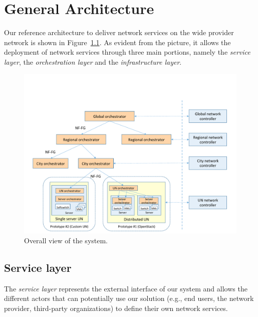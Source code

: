 

\chapter{General Architecture}
\label{chap:gen_arch}
\label{sec:gen_arch}
Our reference architecture to deliver network services on the wide provider network is shown in Figure~\ref{fig:orchestrator}.
As evident from the picture, it allows the deployment of network services through three main portions, namely the \textit{service layer}, the \textit{orchestration layer} and the \textit{infrastructure layer}.

\begin{figure}[h]
	\centering
	\includegraphics[clip= true, width= 1\columnwidth, trim= 0.5cm 0.5cm 1.7cm 0.0cm , page=4]{images/Pictures_definitivo.pdf}
	\caption{Overall view of the system.}
	\label{fig:orchestrator}
\end{figure}


\section{Service layer}
\label{sec:sl_intro}

The \textit{service layer} represents the external interface of our system and allows the different actors that can potentially use our solution (e.g., end users, the network provider, third-party organizations) to define their own network services. 

